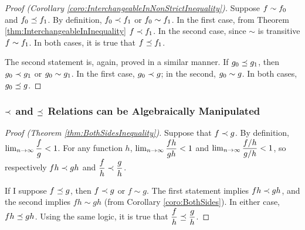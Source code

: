 \begin{proof}[Proof (Corollary \ref{coro:InterchangeableInNonStrictInequality})]
	Suppose $f \sim f_0$ and $f_0 \preceq f_1$. By definition, $f_0 \prec f_1$ or $f_0 \sim f_1$. In the first case, from Theorem \ref{thm:InterchangeableInInequality} $f \prec f_1$. In the second case, since $\sim$ is transitive $f \sim f_1$. In both cases, it is true that $f \preceq f_1$.
	
	The second statement is, again, proved in a similar manner. If $g_0 \preceq g_1$, then $g_0 \prec g_1$ or $g_0 \sim g_1$. In the first case, $g_0 \prec g$; in the second, $g_0 \sim g$. In both cases, $g_0 \preceq g$.
\end{proof}

\subsubsection{$\prec$ and $\preceq$ Relations can be Algebraically Manipulated}

\begin{proof}[Proof (Theorem \ref{thm:BothSidesInequality})]
	Suppose that $f \prec g$. By definition, $\lim_{n \to \infty} \dfrac{f}{g} < 1$. For any function $h$, $\lim_{n \to \infty} \dfrac{fh}{gh} < 1$ and $\lim_{n \to \infty} \dfrac{f / h}{g / h} < 1$, so respectively $fh \prec gh$ and $\dfrac{f}{h} \prec \dfrac{g}{h}$.
	
	If I suppose $f \preceq g$, then $f \prec g$ or $f \sim g$. The first statement implies $fh \prec gh$, and the second implies $fh \sim gh$ (from Corollary \ref{coro:BothSides}). In either case, $fh \preceq gh$. Using the same logic, it is true that $\dfrac{f}{h} \preceq \dfrac{g}{h}$.
\end{proof}